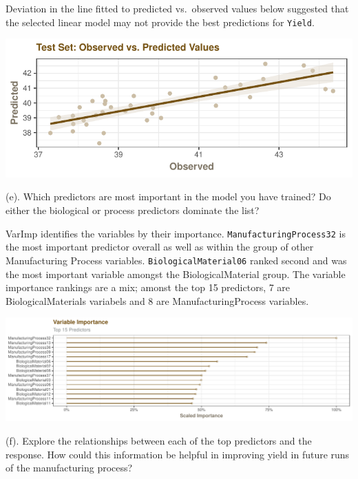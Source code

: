 \documentclass[]{report}
\begin{document}
Deviation in the line fitted to predicted vs.~observed values below
suggested that the selected linear model may not provide the best
predictions for \texttt{Yield}.

\begin{center}\includegraphics{Homework-Two2_files/figure-latex/kj-6.3d-2-1} \end{center}

\begin{subquestion}{(e).} Which predictors are most important in the model you have trained? Do either the biological or process predictors dominate the list? 
\end{subquestion}

VarImp identifies the variables by their importance.
\texttt{ManufacturingProcess32} is the most important predictor overall
as well as within the group of other Manufacturing Process variables.
\texttt{BiologicalMaterial06} ranked second and was the most important
variable amongst the BiologicalMaterial group. The variable importance
rankings are a mix; amonst the top 15 predictors, 7 are
BiologicalMaterials variabels and 8 are ManufacturingProcess variables.

\includegraphics{Homework-Two2_files/figure-latex/kj-6.3e-1.pdf}

\begin{subquestion}{(f).} Explore the relationships between each of the top predictors and the response. How could this information be helpful in improving yield in future runs of the manufacturing process?
\end{subquestion}
\end{document}
